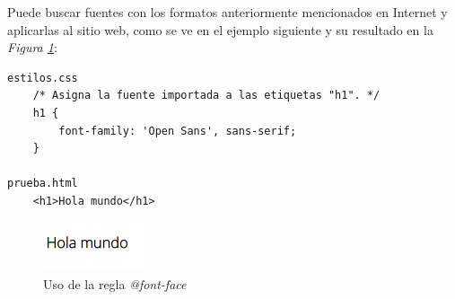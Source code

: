 Puede buscar fuentes con los formatos anteriormente mencionados en Internet y aplicarlas al sitio web, como se ve en el ejemplo siguiente y su resultado en la \textit{Figura \ref{fig: 41}}:
\begin{lstlisting}
estilos.css
    /* Asigna la fuente importada a las etiquetas "h1". */
    h1 {
        font-family: 'Open Sans', sans-serif;
    }
    
prueba.html
    <h1>Hola mundo</h1>
\end{lstlisting}
\begin{figure}[H]
    \centering
    \caption{Uso de la regla \textit{@font-face}}
    \label{fig: 41}
    \includegraphics[width=3cm]{ss/font-face.png}
\end{figure}
